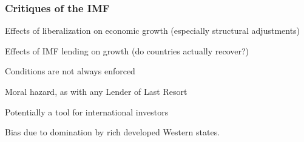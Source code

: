 \documentclass[handout]{beamer}
\begin{document}
\begin{frame} 
	\frametitle{\LARGE{Critiques of the IMF}}
	\begin{itemize}
		\large{
			\item Effects of liberalization on economic growth (especially structural adjustments) \pause 

			\item Effects of IMF lending on growth (do countries actually recover?) \pause 

			\item Conditions are not always enforced \pause 

			\item Moral hazard, as with any Lender of Last Resort \pause  

			\item Potentially a tool for international investors \pause 

			\item Bias due to domination by rich developed Western states.
		}
	\end{itemize}
\end{frame}

\end{document}
